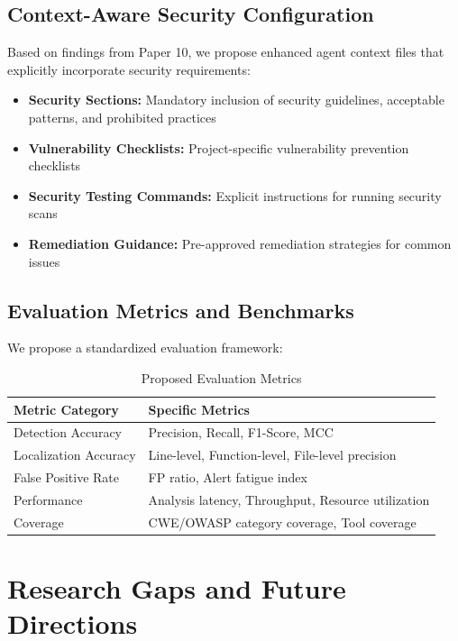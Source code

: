 \documentclass[11pt,a4paper]{article}
\begin{document}
\subsection{Context-Aware Security Configuration}

Based on findings from Paper 10, we propose enhanced agent context files that explicitly incorporate security requirements:

\begin{itemize}
    \item \textbf{Security Sections:} Mandatory inclusion of security guidelines, acceptable patterns, and prohibited practices
    \item \textbf{Vulnerability Checklists:} Project-specific vulnerability prevention checklists
    \item \textbf{Security Testing Commands:} Explicit instructions for running security scans
    \item \textbf{Remediation Guidance:} Pre-approved remediation strategies for common issues
\end{itemize}

\subsection{Evaluation Metrics and Benchmarks}

We propose a standardized evaluation framework:

\begin{table}[H]
\centering
\caption{Proposed Evaluation Metrics}
\begin{tabular}{ll}
\toprule
\textbf{Metric Category} & \textbf{Specific Metrics} \\
\midrule
Detection Accuracy & Precision, Recall, F1-Score, MCC \\
Localization Accuracy & Line-level, Function-level, File-level precision \\
False Positive Rate & FP ratio, Alert fatigue index \\
Performance & Analysis latency, Throughput, Resource utilization \\
Coverage & CWE/OWASP category coverage, Tool coverage \\
\bottomrule
\end{tabular}
\end{table}

\section{Research Gaps and Future Directions}
\end{document}
